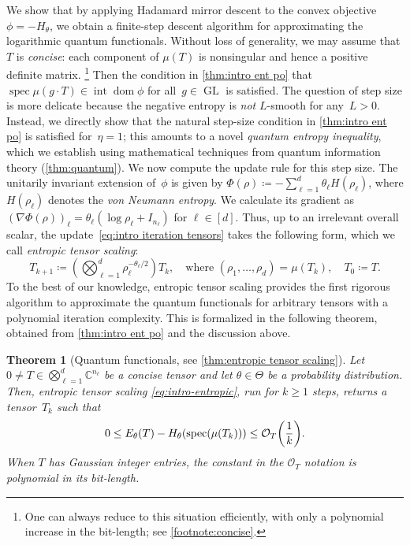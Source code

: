\documentclass[11pt,letterpaper]{article}
\newtheorem{theorem}{Theorem}[section]
\numberwithin{equation}{section}
\newcommand{\CC}{\mathbb{C}}
\newcommand{\logqfunc}{E}
\DeclareMathOperator{\intr}{int}
\DeclareMathOperator{\dom}{dom}
\DeclareMathOperator{\spec}{spec}
\DeclareMathOperator{\GL}{GL}
\begin{document}
We show that by applying Hadamard mirror descent to the convex objective $\phi = -H_\theta$, we obtain a finite-step descent algorithm for approximating the logarithmic quantum functionals.
Without loss of generality, we may assume that $T$ is \emph{concise}: each component of $\mu(T)$ is nonsingular and hence a positive definite matrix.%
\footnote{\label{footnote:intro-concise}One can always reduce to this situation efficiently, with only a polynomial increase in the bit-length; see \cref{footnote:concise}.}
Then the condition in \cref{thm:intro ent po} that $\spec\mu(g \cdot T) \in \intr\dom\phi$ for all~$g \in \GL$ is satisfied.
The question of step size is more delicate because the negative entropy is \emph{not} $L$-smooth for any~$L>0$.
Instead, we directly show that the natural step-size condition in \cref{thm:intro ent po} is satisfied for~$\eta=1$;
this amounts to a novel \emph{quantum entropy inequality}, which we establish using mathematical techniques from quantum information theory (\cref{thm:quantum}).
We now compute the update rule for this step size.
The unitarily invariant extension of~$\phi$ is given by $\Phi(\rho)\coloneqq-\sum_{\ell=1}^d \theta_\ell H(\rho_\ell)$, where $H(\rho_\ell)$ denotes the \emph{von Neumann entropy}.
We calculate its gradient as $(\nabla\Phi(\rho))_\ell=\theta_\ell(\log \rho_\ell+I_{n_\ell})$ for $\ell\in [d]$.
Thus, up to an irrelevant overall scalar, the update~\eqref{eq:intro iteration tensors} takes the following form, which we call \emph{entropic tensor scaling}:
\begin{equation}\label{eq:intro-entropic}
    T_{k+1} \coloneqq \left( \bigotimes_{\ell=1}^d \rho_\ell^{-\theta_\ell/2} \right) T_k,\quad \text{where } (\rho_1,\dots,\rho_d) = \mu(T_k), \quad T_0 \coloneqq T.
\end{equation}
To the best of our knowledge, entropic tensor scaling provides the first rigorous algorithm to approximate the quantum functionals for arbitrary tensors with a polynomial iteration complexity.
This is formalized in the following theorem, obtained from \cref{thm:intro ent po} and the discussion above.

\begin{theorem}[Quantum functionals, see \cref{thm:entropic tensor scaling}]
\label{thm:intro-quantum-functional}
    Let $0\neq T\in \bigotimes_{\ell=1}^d \CC^{n_\ell}$ be a concise tensor and let $\theta \in \Theta$ be a probability distribution.
	Then, entropic tensor scaling \eqref{eq:intro-entropic}, run for $k\geq1$ steps, returns a tensor~$T_k$ such that
    \[
	   0\leq \logqfunc_\theta(T) - H_\theta(\spec(\mu(T_k))) \leq \mathcal O_T\mleft( \frac1k \mright).
	\]
    When $T$ has Gaussian integer entries, the constant in the $\mathcal O_T$ notation is polynomial in its bit-length.
\end{theorem}
\end{document}
